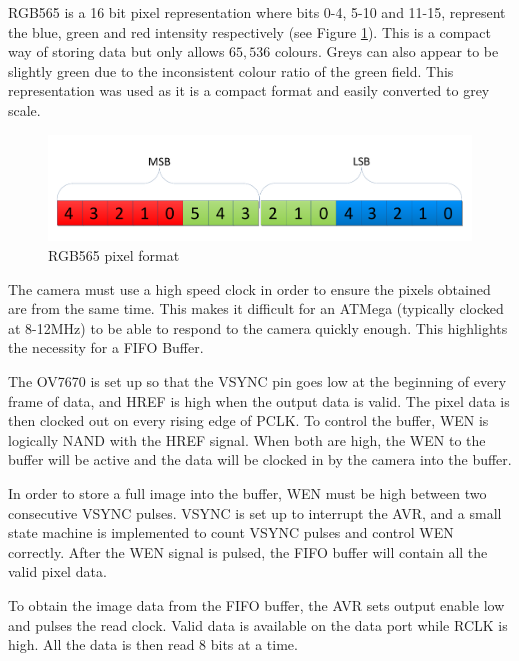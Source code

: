 RGB565 is a 16 bit pixel representation where bits 0-4, 5-10 and 11-15, represent the blue, green and red intensity respectively (see Figure \ref{fig:RGB565}). This is a compact way of storing data but only allows $65,536$ colours. Greys can also appear to be slightly green due to the inconsistent colour ratio of the green field. This representation was used as it is a compact format and easily converted to grey scale.
\begin{figure}
\includegraphics[width = \textwidth]{./Figures/RGB565.pdf}
\caption{RGB565 pixel format}
\label{fig:RGB565}
\end{figure}

The camera must use a high speed clock in order to ensure the pixels obtained are from the same time. This makes it difficult for an ATMega (typically clocked at 8-12MHz) to be able to respond to the camera quickly enough. This highlights the necessity for a FIFO Buffer. 

The OV7670 is set up so that the VSYNC pin goes low at the beginning of every frame of data, and HREF is high when the output data is valid. The pixel data is then clocked out on every rising edge of PCLK. To control the buffer, WEN is logically NAND with the HREF signal. When both are high, the WEN to the buffer will be active and the data will be clocked in by the camera into the buffer. 

In order to store a full image into the buffer, WEN must be high between two consecutive VSYNC pulses. VSYNC is set up to interrupt the AVR, and a small state machine is implemented to count VSYNC pulses and control WEN correctly. After the WEN signal is pulsed, the FIFO buffer will contain all the valid pixel data.

To obtain the image data from the FIFO buffer, the AVR sets output enable low and pulses the read clock. Valid data is available on the data port while RCLK is high. All the data is then read 8 bits at a time.

